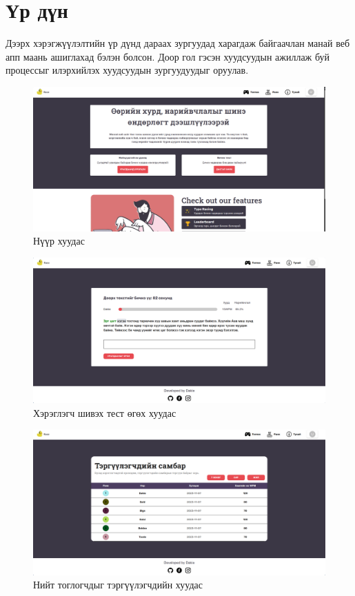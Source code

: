 \chapter{Үр дүн}

Дээрх хэрэгжүүлэлтийн үр дүнд дараах зургуудад харагдаж байгаачлан манай веб апп маань ашиглахад бэлэн болсон. Доор гол гэсэн хуудсуудын ажиллаж буй процессыг илэрхийлэх хуудсуудын зургуудуудыг оруулав.

\begin{figure}[h]
	\centering
	\includegraphics[width=13cm]{images/result/homepage.png}
	\caption{Нүүр хуудас}
	\label{fig:results}
\end{figure}

\begin{figure}[h]
	\centering
	\includegraphics[width=13cm]{images/result/playpage.png}
	\caption{Хэрэглэгч шивэх тест өгөх хуудас}
	\label{fig:results}
\end{figure}

\begin{figure}[h]
	\centering
	\includegraphics[width=13cm]{images/result/rankpage.png}
	\caption{Нийт тоглогчдыг тэргүүлэгчдийн хуудас}
	\label{fig:results}
\end{figure}

